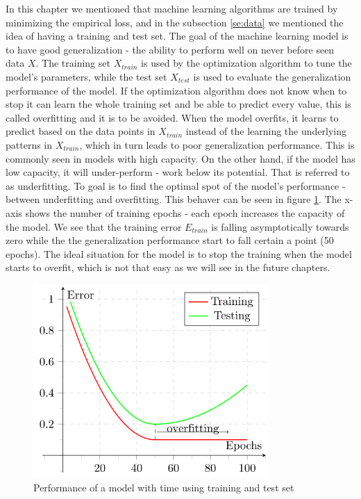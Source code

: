 \documentclass[times, utf8, diplomski]{fer}
\begin{document}
In this chapter we mentioned that machine learning algorithms are trained by minimizing the empirical loss, and in the subsection \ref{se:data} we mentioned the idea of having a training and test set. The goal of the machine learning model is to have good generalization - the ability to perform well on never before seen data $X$. The training set $X_{train}$ is used by the optimization algorithm to tune the model's parameters, while the test set $X_{test}$ is used to evaluate the generalization performance of the model. If the optimization algorithm does not know when to stop it can learn the whole training set and be able to predict every value, this is called overfitting and it is to be avoided. When the model overfits, it learns to predict based on the data points in $X_{train}$ instead of the learning the underlying patterns in $X_{train}$, which in turn leads to poor generalization performance. This is commonly seen in models with high capacity. On the other hand, if the model has low capacity, it will under-perform - work below its potential. That is referred to as underfitting. To goal is to find the optimal spot of the model's performance - between underfitting and overfitting. This behaver can be seen in figure \ref{fig:overfitting}. The x-axis shows the number of training epochs - each epoch increases the capacity of the model. We see that the training error $E_{train}$ is falling asymptotically towards zero while the the generalization performance start to fall certain a point (50 epochs). The ideal situation for the model is to stop the training when the model starts to overfit, which is not that easy as we will see in the future chapters.


\begin{figure}
  \includegraphics[width=0.8\textwidth]{figures/overfitting.png}
  \centering
  \caption{Performance of a model with time using training and test set}
  \label{fig:overfitting}
\end{figure}
\end{document}
